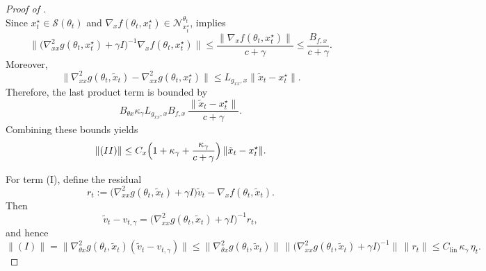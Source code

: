 \documentclass{article}
\theoremstyle{normaltheorem}
\newcommand{\calS}{\mathcal{S}}
\newcommand{\calN}{\mathcal{N}}
\begin{document}
\begin{proof}[Proof of ]
\[\]
Since $x_t^\star\in\calS(\theta_t)$ and \(\nabla_x f(\theta_t,x_t^\star)\in\calN_{x_t^\star}^{\theta_t}\),  implies
\[
\big\|\big(\nabla^2_{xx}g(\theta_t,x_t^\star)+\gamma I\big)^{-1}
\nabla_x f(\theta_t,x_t^\star)\big\|
\le
\frac{\|\nabla_x f(\theta_t,x_t^\star)\|}{c+\gamma}
\le
\frac{B_{f,x}}{c+\gamma}.
\]
Moreover,
\[
\|\nabla^2_{xx}g(\theta_t,\tilde x_t)-\nabla^2_{xx}g(\theta_t,x_t^\star)\|
\le
L_{g_{xx},x}\|\tilde x_t-x_t^\star\|.
\]
Therefore, the last product term is bounded by
\[
B_{\theta x}\kappa_\gamma L_{g_{xx},x}B_{f,x}\,
\frac{\|\tilde x_t-x_t^\star\|}{c+\gamma}.
\]
Combining these bounds yields
\[
\|(II)\|
\le C_x\Bigl(1+\kappa_\gamma+\frac{\kappa_\gamma}{c+\gamma}\Bigr)\,\|\tilde x_t-x_t^\star\|.
\]

For term (I), define the residual
\[
r_t:=
\big(\nabla^2_{xx}g(\theta_t,\tilde x_t)+\gamma I\big)\tilde v_t-\nabla_x f(\theta_t,\tilde x_t).
\]
Then
\[
\tilde v_t-v_{t,\gamma}
=
\big(\nabla^2_{xx}g(\theta_t,\tilde x_t)+\gamma I\big)^{-1}r_t,
\]
and hence
\[
\|(I)\|
=
\|\nabla^2_{\theta x}g(\theta_t,\tilde x_t)(\tilde v_t-v_{t,\gamma})\|
\le
\|\nabla^2_{\theta x}g(\theta_t,\tilde x_t)\|\,
\big\|\big(\nabla^2_{xx}g(\theta_t,\tilde x_t)+\gamma I\big)^{-1}\big\|\,
\|r_t\|
\le C_{\mathrm{lin}}\,\kappa_\gamma\,\eta_t.
\]


\end{proof}
\end{document}
